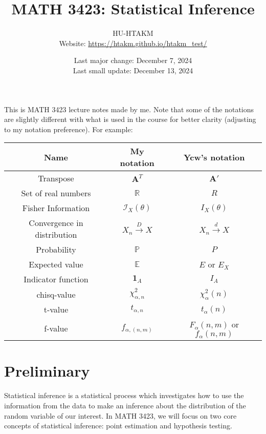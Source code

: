 \documentclass{huhtakm-template-book-v2}
\title{
	\Huge MATH 3423: Statistical Inference
}
\author{
	HU-HTAKM\\
	\small Website: \url{https://htakm.github.io/htakm_test/}
}
\date{
	Last major change: December 7, 2024\\
	Last small update: December 13, 2024
}
\DeclareMathOperator{\prob}{\mathbb{P}}
\DeclareMathOperator{\E}{\mathbb{E}}
\begin{document}
\maketitle
This is MATH 3423 lecture notes made by me. Note that some of the notations are slightly different with what is used in the course for better clarity (adjusting to my notation preference). For example:\\
\begin{tabular}{||c|c|c||}
	\hline
	Name & My notation & Ycw's notation\\
	\hline
	Transpose & $\mathbf{A}^{T}$ &  $\mathbf{A}'$\\
	Set of real numbers & $\mathbb{R}$ & $R$\\
	Fisher Information & $\mathcal{I}_{X}(\theta)$ & $I_{X}(\theta)$\\
	Convergence in distribution & $X_{n}\xrightarrow{D}X$ & $X_{n}\xrightarrow{d}X$\\
	Probability & $\prob$ & $P$\\
	Expected value & $\E$ & $E$ or $E_{X}$\\
	Indicator function & $\mathbf{1}_{A}$ & $I_{A}$\\
	chisq-value & $\chi_{\alpha,n}^{2}$ & $\chi_{\alpha}^{2}(n)$\\
	t-value & $t_{\alpha,n}$ & $t_{\alpha}(n)$\\
	f-value & $f_{\alpha,(n,m)}$ & $F_{\alpha}(n,m)$ or $f_{\alpha}(n,m)$\\
	\hline
\end{tabular}
\tableofcontents
\chapter{Preliminary}
Statistical inference is a statistical process which investigates how to use the information from the data to make an inference about the distribution of the random variable of our interest. In MATH 3423, we will focus on two core concepts of statistical inference: point estimation and hypothesis testing.
\end{document}
